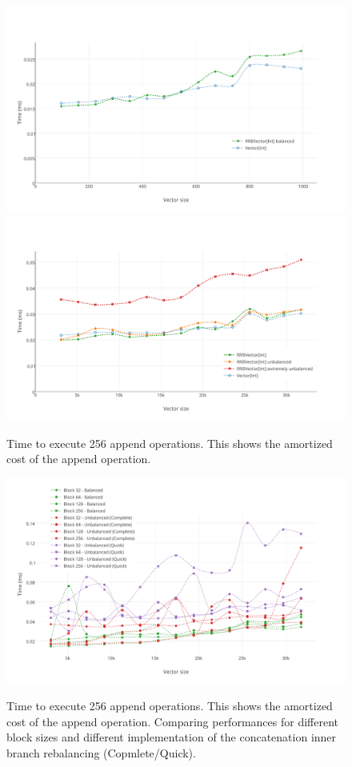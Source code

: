 \begin{figure}[h!]
  \centering
  \includegraphics[width=\textwidth]{Benchmarks/Append_2.pdf}
  \includegraphics[width=\textwidth]{Benchmarks/Append_3.pdf}
  \label{AppendBenchmarks}
  \caption{Time to execute 256 append operations. This shows the amortized cost of the append operation.}
\end{figure}


\begin{figure}[h!]
  \centering
  \includegraphics[width=\textwidth]{Benchmarks/Append_blocks_3.pdf}
  \label{IterationBlocksBenchmarks}
  \caption{Time to execute 256 append operations. This shows the amortized cost of the append operation. Comparing performances for different block sizes and different implementation of the concatenation inner branch rebalancing (Copmlete/Quick).}
\end{figure}


